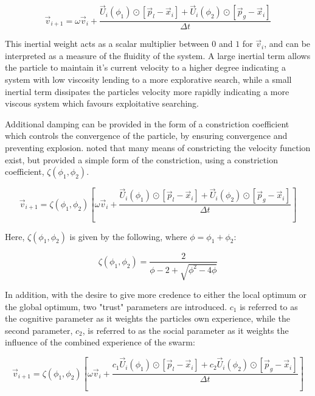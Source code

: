 \begin{equation}
\vec{v}_{i+1} = \omega\vec{v}_i + \frac{\vec{U}_i\left(\phi_1\right)\odot\left[\vec{p}_l-\vec{x}_i\right] + \vec{U}_i\left(\phi_2\right)\odot\left[\vec{p}_g-\vec{x}_i\right]}{\Delta t}
\label{eqn:psoinertia}
\end{equation}

This inertial weight acts as a scalar multiplier between $0$ and $1$ for $\vec{v}_i$, and can be interpreted as a measure of the fluidity of the system. A large inertial term allows the particle to maintain it's current velocity to a higher degree indicating a system with low viscosity lending to a more explorative search, while a small inertial term dissipates the particles velocity more rapidly indicating a more viscous system which favours exploitative searching. 

Additional damping can be provided in the form of a constriction coefficient which controls the convergence of the particle, by ensuring convergence and preventing explosion. \citet{Clerc_2002} noted that many means of constricting the velocity function exist, but provided a simple form of the constriction, using a constriction coefficient, $\zeta\left(\phi_1, \phi_2\right)$. 

\begin{equation}
\vec{v}_{i+1} = \zeta\left(\phi_1, \phi_2\right) \left[\omega\vec{v}_i + \frac{\vec{U}_i\left(\phi_1\right)\odot\left[\vec{p}_l-\vec{x}_i\right] + \vec{U}_i\left(\phi_2\right)\odot\left[\vec{p}_g-\vec{x}_i\right]}{\Delta t}\right]
\label{eqn:psoconstriction}
\end{equation}

Here, $\zeta\left(\phi_1, \phi_2\right)$ is given by the following, where $\phi=\phi_1+\phi_2$:

\begin{equation}
\zeta\left(\phi_1, \phi_2\right) = \frac{2}{\phi-2+\sqrt{\phi^2-4\phi}}
\label{eqn:psoconstriction2}
\end{equation}

In addition, with the desire to give more credence to either the local optimum or the global optimum, two "trust" parameters are introduced. $c_1$ is referred to as the cognitive parameter as it weights the particles own experience, while the second parameter, $c_2$, is referred to as the social parameter as it weights the influence of the combined experience of the swarm:

\begin{equation}
\vec{v}_{i+1} = \zeta\left(\phi_1, \phi_2\right) \left[\omega\vec{v}_i + \frac{c_1\vec{U}_i\left(\phi_1\right)\odot\left[\vec{p}_l-\vec{x}_i\right] + c_2\vec{U}_i\left(\phi_2\right)\odot\left[\vec{p}_g-\vec{x}_i\right]}{\Delta t}\right]
\label{eqn:psoposition}
\end{equation}

